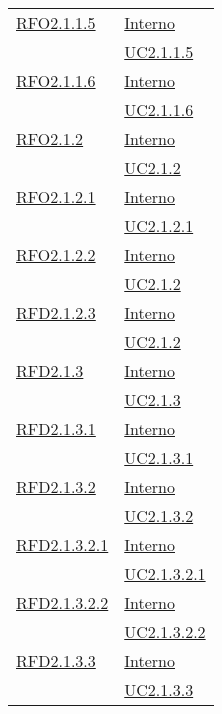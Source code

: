 \begin{longtable}{|>{\centering}m{5cm}|m{5cm}<{\centering}|}
\hyperlink{RFO2.1.1.5}{RFO2.1.1.5} & \hyperlink{Interno}{Interno}\\
& \hyperref[UC2.1.1.5]{UC2.1.1.5}\\ \hline

\hyperlink{RFO2.1.1.6}{RFO2.1.1.6} & \hyperlink{Interno}{Interno}\\
& \hyperref[UC2.1.1.6]{UC2.1.1.6}\\ \hline

\hyperlink{RFO2.1.2}{RFO2.1.2} & \hyperlink{Interno}{Interno}\\
& \hyperref[UC2.1.2]{UC2.1.2}\\ \hline

\hyperlink{RFO2.1.2.1}{RFO2.1.2.1} & \hyperlink{Interno}{Interno}\\
& \hyperref[UC2.1.2.1]{UC2.1.2.1}\\ \hline

\hyperlink{RFO2.1.2.2}{RFO2.1.2.2} & \hyperlink{Interno}{Interno}\\
& \hyperref[UC2.1.2]{UC2.1.2}\\ \hline

\hyperlink{RFD2.1.2.3}{RFD2.1.2.3} & \hyperlink{Interno}{Interno}\\
& \hyperref[UC2.1.2]{UC2.1.2}\\ \hline

\hyperlink{RFD2.1.3}{RFD2.1.3} & \hyperlink{Interno}{Interno}\\
& \hyperref[UC2.1.3]{UC2.1.3}\\ \hline

\hyperlink{RFD2.1.3.1}{RFD2.1.3.1} & \hyperlink{Interno}{Interno}\\
& \hyperref[UC2.1.3.1]{UC2.1.3.1}\\ \hline

\hyperlink{RFD2.1.3.2}{RFD2.1.3.2} & \hyperlink{Interno}{Interno}\\
& \hyperref[UC2.1.3.2]{UC2.1.3.2}\\ \hline

\hyperlink{RFD2.1.3.2.1}{RFD2.1.3.2.1} & \hyperlink{Interno}{Interno}\\
& \hyperref[UC2.1.3.2.1]{UC2.1.3.2.1}\\ \hline

\hyperlink{RFD2.1.3.2.2}{RFD2.1.3.2.2} & \hyperlink{Interno}{Interno}\\
& \hyperref[UC2.1.3.2.2]{UC2.1.3.2.2}\\ \hline

\hyperlink{RFD2.1.3.3}{RFD2.1.3.3} & \hyperlink{Interno}{Interno}\\
& \hyperref[UC2.1.3.3]{UC2.1.3.3}\\ \hline


\end{longtable}
